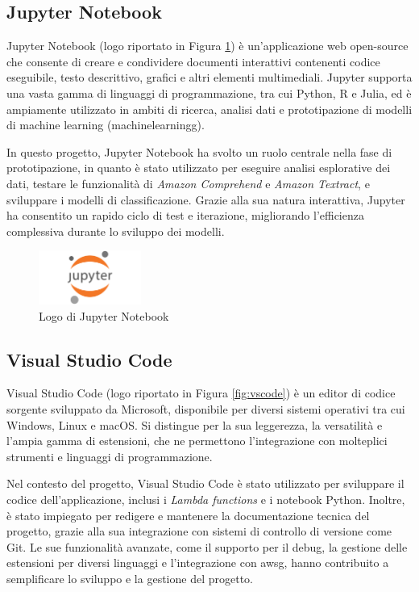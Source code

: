 \subsection{Jupyter Notebook}

Jupyter Notebook (logo riportato in Figura \ref{fig:jupyter}) è un'applicazione web open-source che consente di creare e condividere documenti interattivi contenenti codice eseguibile, testo descrittivo, grafici e altri elementi multimediali. Jupyter supporta una vasta gamma di linguaggi di programmazione, tra cui Python, R e Julia, ed è ampiamente utilizzato in ambiti di ricerca, analisi dati e prototipazione di modelli di machine learning (\gls{machinelearningg}).

In questo progetto, Jupyter Notebook ha svolto un ruolo centrale nella fase di prototipazione, in quanto è stato utilizzato per eseguire analisi esplorative dei dati, testare le funzionalità di \textit{Amazon Comprehend} e \textit{Amazon Textract}, e sviluppare i modelli di classificazione. Grazie alla sua natura interattiva, Jupyter ha consentito un rapido ciclo di test e iterazione, migliorando l'efficienza complessiva durante lo sviluppo dei modelli.

\begin{figure}[h]
  \centering
  \includegraphics[width=0.3\textwidth]{img/tecnologie/jupyter.png}
  \caption{Logo di Jupyter Notebook}
  \label{fig:jupyter}
\end{figure}

\subsection{Visual Studio Code}

Visual Studio Code (logo riportato in Figura \ref{fig:vscode}) è un editor di codice sorgente sviluppato da Microsoft, disponibile per diversi sistemi operativi tra cui Windows, Linux e macOS. Si distingue per la sua leggerezza, la versatilità e l'ampia gamma di estensioni, che ne permettono l'integrazione con molteplici strumenti e linguaggi di programmazione.

Nel contesto del progetto, Visual Studio Code è stato utilizzato per sviluppare il codice dell'applicazione, inclusi i \textit{Lambda functions} e i notebook Python. Inoltre, è stato impiegato per redigere e mantenere la documentazione tecnica del progetto, grazie alla sua integrazione con sistemi di controllo di versione come Git. Le sue funzionalità avanzate, come il supporto per il debug, la gestione delle estensioni per diversi linguaggi e l'integrazione con \gls{awsg}, hanno contribuito a semplificare lo sviluppo e la gestione del progetto.

